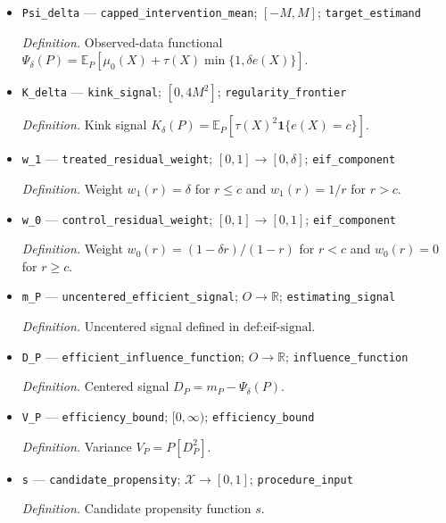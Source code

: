 \documentclass{article}
\begin{document}
\begin{itemize}
  \item \texttt{Psi\_\allowbreak{}delta} --- \texttt{capped\_\allowbreak{}intervention\_\allowbreak{}mean}; \([-M,M]\); \texttt{target\_\allowbreak{}estimand}
  \par\smallskip\noindent\emph{Definition.} Observed-data functional \(\Psi_\delta(P)=\mathbb E_P[\mu_0(X)+\tau(X)\min\{1,\delta e(X)\}]\).
  \item \texttt{K\_\allowbreak{}delta} --- \texttt{kink\_\allowbreak{}signal}; \([0,4M^2]\); \texttt{regularity\_\allowbreak{}frontier}
  \par\smallskip\noindent\emph{Definition.} Kink signal \(K_\delta(P)=\mathbb E_P[\tau(X)^2\mathbf 1\{e(X)=c\}]\).
  \item \texttt{w\_\allowbreak{}1} --- \texttt{treated\_\allowbreak{}residual\_\allowbreak{}weight}; \([0,1]\to[0,\delta]\); \texttt{eif\_\allowbreak{}component}
  \par\smallskip\noindent\emph{Definition.} Weight \(w_1(r)=\delta\) for \(r\le c\) and \(w_1(r)=1/r\) for \(r>c\).
  \item \texttt{w\_\allowbreak{}0} --- \texttt{control\_\allowbreak{}residual\_\allowbreak{}weight}; \([0,1]\to[0,1]\); \texttt{eif\_\allowbreak{}component}
  \par\smallskip\noindent\emph{Definition.} Weight \(w_0(r)=(1-\delta r)/(1-r)\) for \(r<c\) and \(w_0(r)=0\) for \(r\ge c\).
  \item \texttt{m\_\allowbreak{}P} --- \texttt{uncentered\_\allowbreak{}efficient\_\allowbreak{}signal}; \(O\to\mathbb R\); \texttt{estimating\_\allowbreak{}signal}
  \par\smallskip\noindent\emph{Definition.} Uncentered signal defined in \(\text{def:eif-signal}\).
  \item \texttt{D\_\allowbreak{}P} --- \texttt{efficient\_\allowbreak{}influence\_\allowbreak{}function}; \(O\to\mathbb R\); \texttt{influence\_\allowbreak{}function}
  \par\smallskip\noindent\emph{Definition.} Centered signal \(D_P=m_P-\Psi_\delta(P)\).
  \item \texttt{V\_\allowbreak{}P} --- \texttt{efficiency\_\allowbreak{}bound}; \([0,\infty)\); \texttt{efficiency\_\allowbreak{}bound}
  \par\smallskip\noindent\emph{Definition.} Variance \(V_P=P[D_P^2]\).
  \item \texttt{s} --- \texttt{candidate\_\allowbreak{}propensity}; \(\mathcal X\to[0,1]\); \texttt{procedure\_\allowbreak{}input}
  \par\smallskip\noindent\emph{Definition.} Candidate propensity function \(s\).

\end{itemize}
\end{document}
